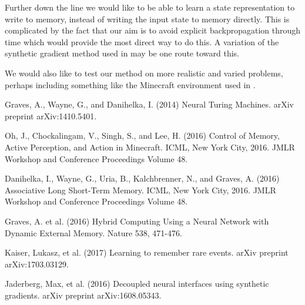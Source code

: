 \documentclass{article}
\begin{document}
Further down the line we would like to be able to learn a state representation to write to memory, instead of writing the input state to memory directly. This is complicated by the fact that our aim is to avoid explicit backpropagation through time which would provide the most direct way to do this. A variation of the synthetic gradient method used in \cite{SYNTH} may be one route toward this.

We would also like to test our method on more realistic and varied problems, perhaps including something like the Minecraft environment used in \cite{MC}.


\begin{thebibliography}{plain}
Graves, A., Wayne, G., and Danihelka, I. (2014) Neural Turing Machines. arXiv preprint arXiv:1410.5401.

Oh, J., Chockalingam, V., Singh, S., and Lee, H. (2016) Control of Memory, Active Perception, and Action in Minecraft. ICML, New York City, 2016. JMLR Workshop and Conference Proceedings Volume 48.

Danihelka, I., Wayne, G., Uria, B., Kalchbrenner, N., and Graves, A. (2016) Associative Long Short-Term Memory. ICML, New York City, 2016. JMLR Workshop and Conference Proceedings Volume 48.

Graves, A. et al. (2016) Hybrid Computing Using a Neural Network with Dynamic External Memory. Nature 538, 471-476.

Kaiser, Lukasz, et al. (2017) Learning to remember rare events. arXiv preprint arXiv:1703.03129.

Jaderberg, Max, et al. (2016) Decoupled neural interfaces using synthetic gradients. arXiv preprint arXiv:1608.05343.
\end{thebibliography}
\end{document}
